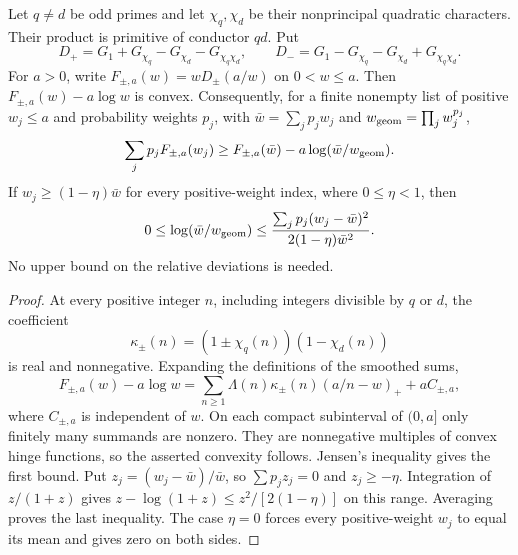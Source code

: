 \begin{lemma}
\label{cs-positive-kernel}
Let $q\ne d$ be odd primes and let $\chi_q,\chi_d$ be their nonprincipal
quadratic characters. Their product is primitive of conductor $qd$.
Put
\[
 D_+=G_1+G_{\chi_q}-G_{\chi_d}-G_{\chi_q\chi_d},\qquad
 D_-=G_1-G_{\chi_q}-G_{\chi_d}+G_{\chi_q\chi_d}.
\]
For $a>0$, write $F_{\pm,a}(w)=wD_\pm(a/w)$ on $0<w\le a$.
Then $F_{\pm,a}(w)-a\log w$ is convex. Consequently, for a finite nonempty list of positive
$w_j\le a$ and probability weights $p_j$, with
$\bar w=\sum_jp_jw_j$ and $w_{\rm geom}=\prod_jw_j^{p_j}$,
\[
 \sum_jp_jF_{\pm,a}(w_j)
 \ge F_{\pm,a}(\bar w)-a\log(\bar w/w_{\rm geom}).
\]
If $w_j\ge(1-\eta)\bar w$ for every positive-weight index, where
$0\le\eta<1$, then
\[
 0\le\log(\bar w/w_{\rm geom})
 \le\frac{\sum_jp_j(w_j-\bar w)^2}
             {2(1-\eta)\bar w^2}.
\]
No upper bound on the relative deviations is needed.
\end{lemma}
\begin{proof}
At every positive integer $n$, including integers divisible by $q$ or
$d$, the coefficient
\[
 \kappa_\pm(n)=(1\pm\chi_q(n))(1-\chi_d(n))
\]
is real and nonnegative. Expanding the definitions of the smoothed sums,
\[
 F_{\pm,a}(w)-a\log w
 =\sum_{n\ge1}\Lambda(n)\kappa_\pm(n)(a/n-w)_++aC_{\pm,a},
\]
where $C_{\pm,a}$ is independent of $w$. On each compact subinterval
of $(0,a]$ only finitely many summands are nonzero. They are nonnegative
multiples of convex hinge functions, so the asserted convexity follows.
Jensen's inequality gives the first bound. Put
$z_j=(w_j-\bar w)/\bar w$, so $\sum p_jz_j=0$ and $z_j\ge-\eta$.
Integration of $z/(1+z)$ gives
$z-\log(1+z)\le z^2/[2(1-\eta)]$ on this range.
Averaging proves the last inequality. The case $\eta=0$ forces every
positive-weight $w_j$ to equal its mean and gives zero on both sides.
\end{proof}

